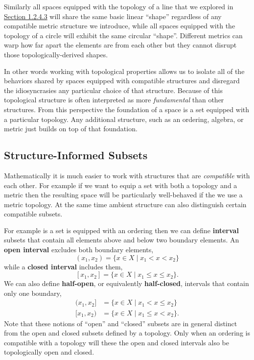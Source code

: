 \documentclass[
  letterpaper,
  DIV=11,
  numbers=noendperiod]{scrartcl}
\begin{document}
Similarly all spaces equipped with the topology of a line that we
explored in \href{@sec:general-topology}{Section 1.2.4.3} will share the
same basic linear ``shape'' regardless of any compatible metric
structure we introduce, while all spaces equipped with the topology of a
circle will exhibit the same circular ``shape''. Different metrics can
warp how far apart the elements are from each other but they cannot
disrupt those topologically-derived shapes.

In other words working with topological properties allows us to isolate
all of the behaviors shared by spaces equipped with compatible
structures and disregard the idiosyncrasies any particular choice of
that structure. Because of this topological structure is often
interpreted as more \emph{fundamental} than other structures. From this
perspective the foundation of a space is a set equipped with a
particular topology. Any additional structure, such as an ordering,
algebra, or metric just builds on top of that foundation.

\hypertarget{structure-informed-subsets}{%
\subsection{Structure-Informed
Subsets}\label{structure-informed-subsets}}

Mathematically it is much easier to work with structures that are
\emph{compatible} with each other. For example if we want to equip a set
with both a topology and a metric then the resulting space will be
particularly well-behaved if the we use a metric topology. At the same
time ambient structure can also distinguish certain compatible subsets.

For example is a set is equipped with an ordering then we can define
\textbf{interval} subsets that contain all elements above and below two
boundary elements. An \textbf{open interval} excludes both boundary
elements, \[
(x_{1}, x_{2}) =
\{ x \in X \mid x_{1} < x < x_{2} \}
\] while a \textbf{closed interval} includes them, \[
[x_{1}, x_{2}] =
\{ x \in X \mid x_{1} \le x \le x_{2} \}.
\] We can also define \textbf{half-open}, or equivalently
\textbf{half-closed}, intervals that contain only one boundary,
\begin{align*}
(x_{1}, x_{2}] &= \{ x \in X \mid x_{1} < x \le x_{2} \}
\\
[x_{1}, x_{2}) &= \{ x \in X \mid x_{1} \le x < x_{2} \}.
\end{align*} Note that these notions of ``open'' and ``closed'' subsets
are in general distinct from the open and closed subsets defined by a
topology. Only when an ordering is compatible with a topology will these
the open and closed intervals also be topologically open and closed.
\end{document}
